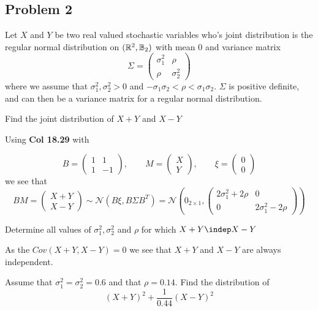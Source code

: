 \subsection{Problem 2} %
\label{sub:problem_2}
Let \(X\) and \(Y\) be two real valued stochastic variables who's joint distribution is the regular normal distribution on \(({\mathbb{R}}^2,{\mathbb{B}}_2)\) with mean 0 and variance matrix
\[
\Sigma =
	\begin{pmatrix}
	\sigma_1^2 & \rho \\
	\rho & \sigma_2^2
	\end{pmatrix}
\]
where we assume that \(\sigma_1^2,\sigma_2^2>0\) and \(-\sigma_1\sigma_2<\rho<\sigma_1\sigma_2\). \(\Sigma\) is positive definite, and can then be a variance matrix for a regular normal distribution.
\begin{problem}
Find the joint distribution of \(X+Y\) and \(X-Y\)
\end{problem}
\begin{solution}
Using \textbf{Col 18.29} with

\[
	B=\begin{pmatrix} 1 & 1 \\ 1 & -1 \end{pmatrix}, \qquad M= \begin{pmatrix} X \\ Y\end{pmatrix} ,\qquad \xi = \begin{pmatrix}
	0 \\ 0\end{pmatrix}
\]
we see that
\[ BM =
	\begin{pmatrix}
	 X + Y \\
	 X - Y
	 \end{pmatrix}
	 \sim\mathcal{N}(B \xi,B\Sigma B^T)=\mathcal{N}(0_{2\times1},
	 \begin{pmatrix}
	  2\sigma_1^2+2\rho & 0 \\
	  0 & 2\sigma_1^2-2\rho
	  \end{pmatrix} )
\]

\end{solution}
\begin{problem}
Determine all values of \(\sigma_1^2,\sigma_2^2\) and \(\rho\) for which \(X+Y\indep X-Y\)
\end{problem}
\begin{solution}
As the \(Cov(X+Y,X-Y)=0\)  we see that \(X+Y\) and \(X-Y\) are always independent.
\end{solution}
\begin{problem}
Assume that \(\sigma_1^2=\sigma_2^2=0.6\) and that \(\rho=0.14\). Find the distribution of
\[
	(X+Y)^2+\frac{1}{0.44}(X-Y)^2
\]
\end{problem}
